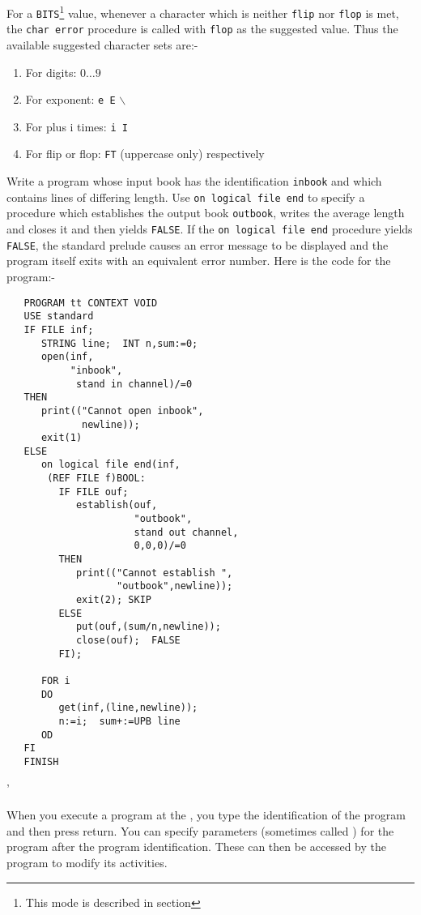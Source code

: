For a \verb|BITS|\footnote{This mode is described in section
} value, whenever a character which is neither \verb|flip|
nor \verb|flop| is met, the \verb|char error| procedure is called
with \verb|flop| as the suggested value. Thus the available suggested
character sets are:-
\begin{enumerate}
\item For digits: $0\ldots9$
\item For exponent: \verb|e E| $\backslash$
\item For plus i times: \verb|i I|
\item For flip or flop: \verb|FT| (uppercase only) respectively
\end{enumerate}

\begin{exercise}
\item Write a program whose input book has the identification
\verb|inbook| and which contains lines of differing length. Use
\verb|on logical file end| to specify a procedure which establishes
the output book \verb|outbook|, writes the average length and closes
it and then yields \verb|FALSE|. \ans If the
\verb|on logical file end| procedure yields\newline
\verb|FALSE|, the standard prelude causes an error message to be
displayed and the program itself exits with an equivalent error
number. Here is the code for the program:-
\begin{verbatim}
   PROGRAM tt CONTEXT VOID
   USE standard
   IF FILE inf;
      STRING line;  INT n,sum:=0;
      open(inf,
           "inbook",
            stand in channel)/=0
   THEN
      print(("Cannot open inbook",
             newline));
      exit(1)
   ELSE
      on logical file end(inf,
       (REF FILE f)BOOL:
         IF FILE ouf;
            establish(ouf,
                      "outbook",
                      stand out channel,
                      0,0,0)/=0
         THEN
            print(("Cannot establish ",
                   "outbook",newline));
            exit(2); SKIP
         ELSE
            put(ouf,(sum/n,newline));
            close(ouf);  FALSE
         FI);

      FOR i
      DO
         get(inf,(line,newline));
         n:=i;  sum+:=UPB line
      OD
   FI  
   FINISH
\end{verbatim}
'
\end{exercise}

When you execute a program at the , you type the
identification of the program and then press return.  You can specify
parameters (sometimes called ) for
the program after the program identification.  These can then be
accessed by the program to modify its activities.


